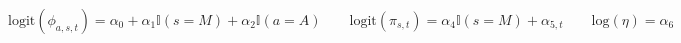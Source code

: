\begin{equation}
  \text{logit}(\phi_{a, s, t}) = \alpha_{0} + \alpha_{1}\mathbb{I}(s = M) + \alpha_{2}\mathbb{I}(a = A) \qquad
  \text{logit}(\pi_{s, t}) = \alpha_{4} \mathbb{I}(s = M) + \alpha_{5, t} \qquad
  \text{log}(\eta) = \alpha_{6}
  \label{eqn:parameterisation-info}
\end{equation}